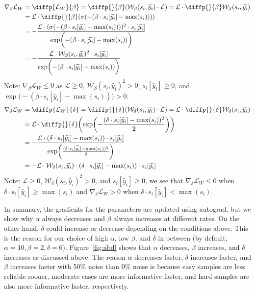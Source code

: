 \documentclass{article}
\theoremstyle{plain}
\theoremstyle{definition}
\theoremstyle{remark}
\begin{document}
\begin{align}
    \nabla_{\beta}\mathcal{L}_{W} &= \diffp{\mathcal{L}_{W}}{\beta} = \diffp{}{\beta} (\mathcal{W}_\beta (s_i, \widetilde{y_i}) \cdot \mathcal{L})= \mathcal{L} \cdot \diffp{}{\beta} \mathcal{W}_\beta (s_i, \widetilde{y_i}) \nonumber \\ &= \mathcal{L} \cdot \diffp{}{\beta} (\sigma(-(\beta \cdot s_i[\widetilde{y_i}] - \max(s_i)))) \nonumber \\ &= -\frac{\mathcal{L} \cdot (\sigma(-(\beta \cdot s_i[\widetilde{y_i}] - \max(s_i))))^2 \cdot s_i[\widetilde{y_i}]}{\exp\biggl(-(\beta \cdot s_i[\widetilde{y_i}] - \max(s_i))\biggl)}\nonumber \\ &= -\frac{\mathcal{L} \cdot \mathcal{W}_\beta (s_i, \widetilde{y_i})^2 \cdot s_i[\widetilde{y_i}]}{\exp\biggl(-(\beta \cdot s_i[\widetilde{y_i}] - \max(s_i))\biggl)}\nonumber
\end{align}
\noindent Note: $\nabla_{\beta}\mathcal{L}_{W} \leq 0$ as $\mathcal{L} \geq 0$, $\mathcal{W}_\beta (s_i, \widetilde{y_i})^2 > 0$, $s_i[\widetilde{y_i}] \geq 0$, and $\exp\biggl(-(\beta \cdot s_i[\widetilde{y_i}] - \max(s_i))\biggl) > 0$.
\begin{align}\nabla_{\delta}\mathcal{L}_{W} &= \diffp{\mathcal{L}_{W}}{\delta} = \diffp{}{\delta} (\mathcal{W}_\delta (s_i, \widetilde{y_i}) \cdot \mathcal{L}) = \mathcal{L} \cdot \diffp{}{\delta} \mathcal{W}_\delta (s_i, \widetilde{y_i}) \nonumber \\ &= \mathcal{L} \cdot \diffp{}{\delta} \biggl(\exp\biggl(-\frac{(\delta \cdot s_i[\widetilde{y_i}] - \max(s_i))^2}{2}\biggr)\biggr) \nonumber \\ &= -\frac{\mathcal{L} \cdot (\delta \cdot s_i[\widetilde{y_i}] - \max(s_i)) \cdot s_i[\widetilde{y_i}]}{\exp\biggl(\frac{(\delta \cdot s_i[\widetilde{y_i}] - \max(s_i))^2}{2}\biggr)}\nonumber \\ &= -\mathcal{L} \cdot \mathcal{W}_\delta (s_i, \widetilde{y_i}) \cdot (\delta \cdot s_i[\widetilde{y_i}] - \max(s_i)) \cdot s_i[\widetilde{y_i}]\nonumber
\end{align}
\noindent Note: $\mathcal{L} \geq 0$, $\mathcal{W}_\delta (s_i, \widetilde{y_i})^2 > 0$, and $s_i[\widetilde{y_i}] \geq 0$, we see that $\nabla_{\delta}\mathcal{L}_{W} \leq 0$ when $\delta \cdot s_i[\widetilde{y_i}] \geq \max(s_i)$ and $\nabla_{\delta}\mathcal{L}_{W} > 0$ when $\delta \cdot s_i[\widetilde{y_i}] < \max(s_i)$.

In summary, the gradients for the parameters are updated using autograd, but we show why $\alpha$ always decreases and $\beta$ always increases at different rates. On the other hand, $\delta$ could increase or decrease depending on the conditions above. This is the reason for our choice of high $\alpha$, low $\beta$, and $\delta$ in between (by default, $\alpha=10,\beta=2,\delta=6$). Figure~\ref{fig:abd} shows that $\alpha$ decreases, $\beta$ increases, and $\delta$ increases as discussed above. The reason $\alpha$ decreases faster, $\delta$ increases faster, and $\beta$ increases faster with 50\% noise than 0\% noise is because easy samples are less reliable sooner, moderate cases are more informative faster, and hard samples are also more informative faster, respectively.
\end{document}
